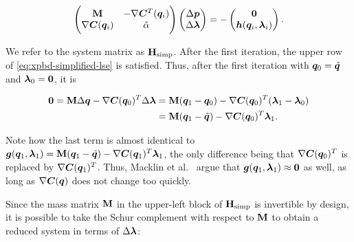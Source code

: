 \begin{equation}\label{eq:xpbd-simplified-lse}
    \begin{pmatrix}
        \mathbf{M} & -\nabla\bm{C}^T(\bm{q}_i) \\
        \nabla \bm{C}(\bm{q}_i) & \tilde{\mathbf{\alpha}}
    \end{pmatrix}
    \begin{pmatrix}
        \Delta \bm{p} \\
        \Delta \bm{\lambda}
    \end{pmatrix}
    = -
    \begin{pmatrix}
    \bm{0} \\
    \bm{h}(\bm{q}_i, \bm{\lambda}_i)
    \end{pmatrix}.
\end{equation}

\noindent We refer to the system matrix as $\mathbf{H}_{\text{simp}}$. After the first iteration, the upper row of \autoref{eq:xpbd-simplified-lse} 
is satisfied. Thus, after the first iteration with $\bm{q}_0 = \tilde{\bm{q}}$ and $\bm{\lambda}_0 = \bm{0}$, it is

\begin{equation}
\begin{split}
    \bm{0} = \mathbf{M}\Delta\bm{q} - \nabla \bm{C}(\bm{q}_0)^T \Delta \bm{\lambda} &= \mathbf{M}(\bm{q}_1 - \bm{q}_0) - \nabla \bm{C}(\bm{q}_0)^T 
    (\bm{\lambda}_1 - \bm{\lambda}_0) \\
    &= \mathbf{M}(\bm{q}_1 - \tilde{\bm{q}}) - \nabla \bm{C}(\bm{q}_0)^T \bm{\lambda}_1. \label{eq:xpbd-assumption-2-detail}
\end{split}
\end{equation}

\noindent Note how the last term is almost identical to $\bm{g}(\bm{q}_1, \bm{\lambda}_1) = \mathbf{M}(\bm{q}_1 - \tilde{\bm{q}}) - \nabla 
\bm{C}(\bm{q}_1)^T \bm{\lambda}_1$, the only difference being that $\nabla \bm{C}(\bm{q}_0)^T$ is replaced by $\nabla \bm{C}(\bm{q}_1)^T$. Thus, 
Macklin et al.\ \cite{macklin2016} argue that $\bm{g}(\bm{q}_1, \bm{\lambda}_1) \approx \bm{0}$ as well, as long as $\nabla \bm{C}(\bm{q})$ 
does not change too quickly.

Since the mass matrix $\mathbf{M}$ in the upper-left block of $\mathbf{H}_{\text{simp}}$ is invertible by design, it is possible
to take the Schur complement with respect to $\mathbf{M}$ to obtain a reduced system in terms of $\Delta \bm{\lambda}$:

